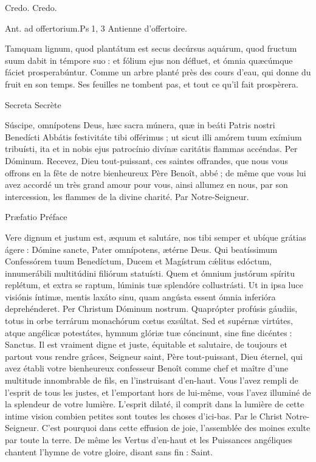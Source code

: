 \begin{paracol}{2}
Credo.
\switchcolumn
Credo.
\switchcolumn*

Ant. ad offertorium.\hfill Ps 1, 3
\switchcolumn
Antienne d’offertoire.
\switchcolumn*

Tamquam lignum, quod plantátum est secus decúrsus aquárum, quod fructum suum dabit in témpore suo : et fólium ejus non défluet, et ómnia quæcúmque fáciet prosperabúntur.
\switchcolumn
Comme un arbre planté près des cours d’eau, qui donne du fruit en son temps. Ses feuilles ne tombent pas, et tout ce qu’il fait prospèrera.
\switchcolumn*

Secreta
\switchcolumn
Secrète
\switchcolumn*

Súscipe, omnípotens Deus, hæc  sacra múnera, quæ in beáti Patris nostri Benedícti Abbátis festivitáte tibi offérimus ; ut sicut illi amórem tuum exímium tribuísti, ita et in nobis ejus patrocínio divínæ caritátis flammas accéndas. Per Dóminum.
\switchcolumn
Recevez, Dieu tout-puissant, ces saintes  offrandes, que nous vous offrons en la fête de notre bienheureux Père Benoît, abbé ; de même que vous lui avez accordé un très grand amour pour vous, ainsi allumez en nous, par son intercession, les flammes de la divine charité. Par Notre-Seigneur.
\switchcolumn*

Præfatio
\switchcolumn
Préface
\switchcolumn*

Vere dignum et justum est, æquum et salutáre, nos tibi semper et ubíque grátias ágere : Dómine sancte, Pater omnípotens, ætérne Deus. Qui beatíssimum Confessórem tuum Benedíctum, Ducem et Magístrum cǽlitus edóctum, innumerábili multitúdini filiórum statuísti. Quem et ómnium justórum spíritu replétum, et extra se raptum, lúminis tuæ splendóre collustrásti. Ut in ipsa luce visiónis íntimæ, mentis laxáto sinu, quam angústa essent ómnia inferióra deprehénderet. Per Christum Dóminum nostrum. Quaprópter profúsis gáudiis, totus in orbe terrárum monachórum cœtus exsúltat. Sed et supérnæ virtútes, atque angélicæ potestátes, hymnum glóriæ tuæ cóncinunt, sine fine dicéntes : Sanctus.
\switchcolumn
Il est vraiment digne et juste, équitable et salutaire, de toujours et partout vous rendre grâces, Seigneur saint, Père tout-puissant, Dieu éternel, qui avez établi votre bienheureux confesseur Benoît comme chef et maître d’une multitude innombrable de fils, en l’instruisant d’en-haut. Vous l’avez rempli de l’esprit de tous les justes, et l’emportant hors de lui-même, vous l’avez illuminé de la splendeur de votre lumière. L’esprit dilaté, il comprit dans la lumière de cette intime vision combien petites sont toutes les choses d’ici-bas. Par le Christ Notre-Seigneur. C’est pourquoi dans cette effusion de joie, l’assemblée des moines exulte par toute la terre. De même les Vertus d’en-haut et les Puissances angéliques chantent l’hymne de votre gloire, disant sans fin : Saint.
\switchcolumn*


\end{paracol}
